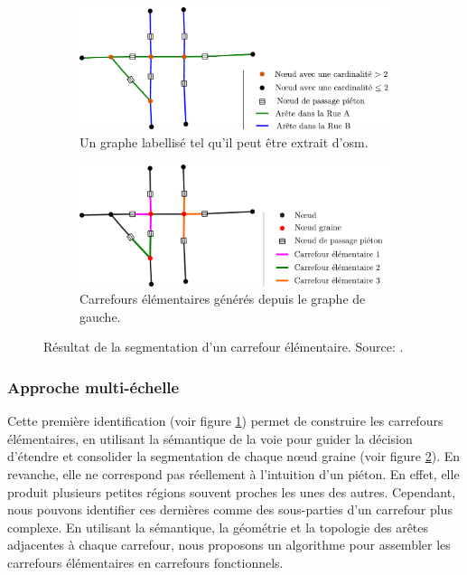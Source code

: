 \begin{figure}
    \centering
    \begin{subfigure}[t]{.49\linewidth}
        \includegraphics[width=\textwidth]{images/modelisation/segmentation/segmentation-step1.pdf}
        \caption{Un graphe labellisé tel qu'il peut être extrait d'\gls{osm}.\label{fig:modelisation_segmentation_step1}}
    \end{subfigure}
    \begin{subfigure}[t]{.49\linewidth}
        \includegraphics[width=\textwidth]{images/modelisation/segmentation/segmentation-step2.pdf}
        \caption{Carrefours élémentaires générés depuis le graphe de gauche. \label{fig:modelisation_segmentation_step2}}
    \end{subfigure}
    \caption{Résultat de la segmentation d'un carrefour élémentaire. Source: \cite{Favreau2022}.}
    \label{fig:modelisation_segmentation_step1&2}
\end{figure}

\subsubsection{Approche multi-échelle}

Cette première identification (voir figure \ref{fig:modelisation_segmentation_step1}) permet de construire les carrefours élémentaires, en utilisant la sémantique de la voie pour guider la décision d'étendre et consolider la segmentation de chaque nœud graine (voir figure \ref{fig:modelisation_segmentation_step2}). En revanche, elle ne correspond pas réellement à l'intuition d'un piéton. En effet, elle produit plusieurs petites régions souvent proches les unes des autres. Cependant, nous pouvons identifier ces dernières comme des sous-parties d'un carrefour plus complexe. En utilisant la sémantique, la géométrie et la topologie des arêtes adjacentes à chaque carrefour, nous proposons un algorithme pour assembler les carrefours élémentaires en carrefours fonctionnels.

